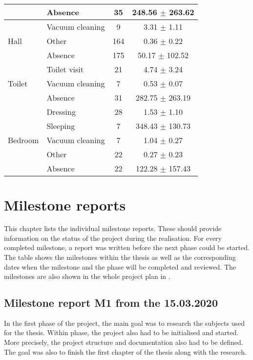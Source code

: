 \begin{table}[htbp]
\begin{tabular}{l|l|c|c}
        \cline{2-4}
        & Absence & 35 & 248.56 $\pm$ 263.62 \\
        \midrule[1pt]
        \multirow{3}{*}{Hall} & Vacuum cleaning & 9 & 3.31 $\pm$ 1.11 \\
        \cline{2-4}
        & Other & 164 & 0.36 $\pm$ 0.22 \\
        \cline{2-4}
        & Absence & 175 & 50.17 $\pm$ 102.52 \\
        \midrule[1pt]
        \multirow{3}{*}{Toilet} & Toilet visit & 21 & 4.74 $\pm$ 3.24 \\
        \cline{2-4}
        & Vacuum cleaning & 7 & 0.53 $\pm$ 0.07 \\
        \cline{2-4}
        & Absence & 31 & 282.75 $\pm$ 263.19 \\
        \midrule[1pt]
        \multirow{5}{*}{Bedroom} & Dressing & 28 & 1.53 $\pm$ 1.10 \\
        \cline{2-4}
        & Sleeping & 7 & 348.43 $\pm$ 130.73 \\
        \cline{2-4}
        & Vacuum cleaning & 7 & 1.04 $\pm$ 0.27 \\
        \cline{2-4}
        & Other & 22 & 0.27 $\pm$ 0.23 \\
        \cline{2-4}
        & Absence & 22 & 122.28 $\pm$ 157.43 \\
        \bottomrule
    \end{tabular}
\end{table}

\chapter{Milestone reports}
\label{app:Milestone-Reports}
This chapter lists the individual milestone reports. These should provide information on the status of the project during the realisation. For every completed milestone, a report was written before the next phase could be started. The table  shows the milestones within the thesis as well as the corresponding dates when the milestone and the phase will be completed and reviewed. The milestones are also shown in the whole project plan in .

\section{Milestone report M1 from the 15.03.2020}
In the first phase of the project, the main goal was to research the subjects used for the thesis. Within phase, the project also had to be initialised and started. More precisely, the project structure and documentation also had to be defined. The goal was also to finish the first chapter of the thesis  along with the research.

